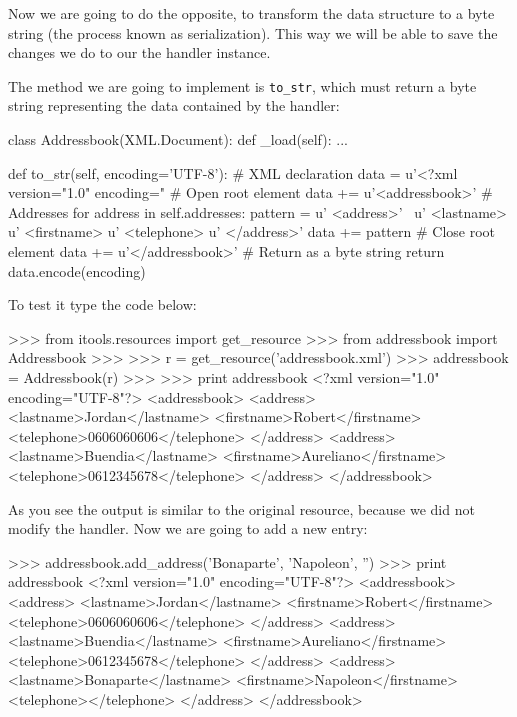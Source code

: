 Now we are going to do the opposite, to transform the data structure to
a byte string (the process known as serialization). This way we will be
able to save the changes we do to our the handler instance.

The method we are going to implement is {\tt to\_str}, which must return
a byte string representing the data contained by the handler:

\begin{code}
    class Addressbook(XML.Document):
        def _load(self):
            ...


        def to_str(self, encoding='UTF-8'):
            # XML declaration
            data = u'<?xml version="1.0" encoding="%
            # Open root element
            data += u'<addressbook>\n'
            # Addresses
            for address in self.addresses:
                pattern = u'  <address>\n' \
                          u'    <lastname>%
                          u'    <firstname>%
                          u'    <telephone>%
                          u'  </address>\n'
                data += pattern %
            # Close root element
            data += u'</addressbook>'
            # Return as a byte string
            return data.encode(encoding)
\end{code}

To test it type the code below:

\begin{code}
    >>> from itools.resources import get_resource
    >>> from addressbook import Addressbook
    >>>
    >>> r = get_resource('addressbook.xml')
    >>> addressbook = Addressbook(r)
    >>>
    >>> print addressbook
    <?xml version="1.0" encoding="UTF-8"?>
    <addressbook>
      <address>
        <lastname>Jordan</lastname>
        <firstname>Robert</firstname>
        <telephone>0606060606</telephone>
      </address>
      <address>
        <lastname>Buendia</lastname>
        <firstname>Aureliano</firstname>
        <telephone>0612345678</telephone>
      </address>
    </addressbook>
\end{code}

As you see the output is similar to the original resource, because we did not
modify the handler. Now we are going to add a new entry:

\begin{code}
    >>> addressbook.add_address('Bonaparte', 'Napoleon', '')
    >>> print addressbook
    <?xml version="1.0" encoding="UTF-8"?>
    <addressbook>
      <address>
        <lastname>Jordan</lastname>
        <firstname>Robert</firstname>
        <telephone>0606060606</telephone>
      </address>
      <address>
        <lastname>Buendia</lastname>
        <firstname>Aureliano</firstname>
        <telephone>0612345678</telephone>
     </address>
     <address>
       <lastname>Bonaparte</lastname>
       <firstname>Napoleon</firstname>
       <telephone></telephone>
     </address>
   </addressbook>
\end{code}

